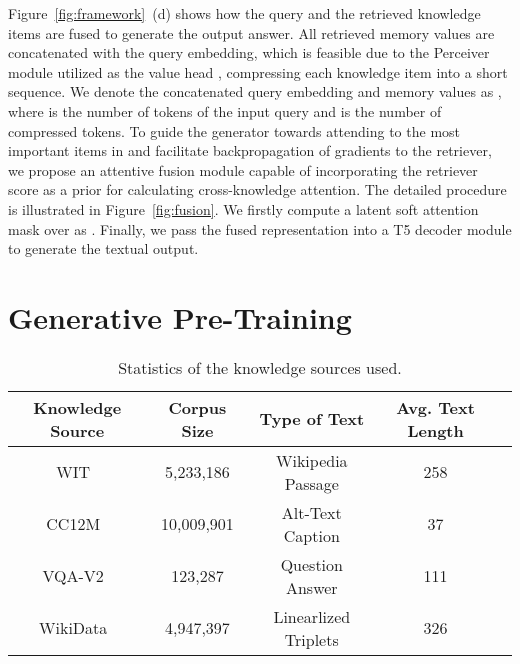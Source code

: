 \documentclass[10pt,twocolumn,letterpaper]{article}
\begin{document}
Figure~\ref{fig:framework}~(d) shows how the query and the retrieved knowledge items are fused to generate the output answer.
All  retrieved memory values are concatenated with the query embedding, which is feasible due to the Perceiver module utilized as the value head , compressing each knowledge item into a short sequence. We denote the concatenated query embedding and memory values as , where  is the number of tokens of the input query  and  is the number of compressed tokens. To guide the generator towards attending to the most important items in  and facilitate backpropagation of gradients to the retriever, we propose an attentive fusion module  capable of incorporating the retriever score as a prior for calculating cross-knowledge attention. The detailed procedure is illustrated in Figure~\ref{fig:fusion}. We firstly 
compute a latent soft attention mask over  as .
Finally, we pass the fused representation  into a T5 decoder module  to generate the textual output.







































%
 \section{Generative Pre-Training}\label{sec:training}
{ \setlength\tabcolsep{2pt} 
\begin{table}[t!]
\centering
\footnotesize
\begin{tabular}{c|cccc} \toprule
Knowledge Source & Corpus Size & Type of Text & Avg. Text Length  \\ \midrule
WIT~\cite{DBLP:conf/sigir/Srinivasan0CBN21} & 5,233,186 & Wikipedia Passage & 258 \\
CC12M~\cite{changpinyo2021cc12m} & 10,009,901& Alt-Text Caption & 37  \\ 
VQA-V2~\cite{DBLP:journals/ijcv/GoyalKASBP19} & 123,287 & Question Answer & 111 \\ 
WikiData~\cite{DBLP:journals/cacm/VrandecicK14} & 4,947,397& Linearlized Triplets & 326  \\
\bottomrule
\end{tabular}
\caption{Statistics of the knowledge sources used.}
\label{tab:kb}
\end{table}
}
\end{document}
